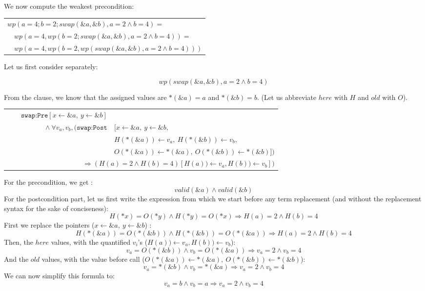 We now compute the weakest precondition:


\begin{tabular}{l}
  $wp(a = 4; b = 2; swap(\&a, \&b), a = 2 \wedge b = 4) = $\\
  $\quad wp(a = 4, wp(b = 2; swap(\&a, \&b), a = 2 \wedge b = 4)) = $\\
  $\quad wp(a = 4, wp(b = 2, wp(swap(\&a, \&b), a = 2 \wedge b = 4)))$
\end{tabular}


Let us first consider separately:


$$wp(swap(\&a, \&b), a = 2 \wedge b = 4)$$



From the  clause, we know that the assigned values are
$*(\&a) = a$ and $*(\&b) = b$. (Let us abbreviate $here$ with $H$ and $old$ with
$O$).


\begin{tabular}{rl}
  $\quad \quad \texttt{swap:Pre}[x \leftarrow \&a,\ y \leftarrow \&b]$ & \\
  $\quad \wedge \forall v_a, v_b,(\texttt{swap:Post}$ & $ [ x \leftarrow \&a,\ y \leftarrow \&b, $ \\
                               & $H(*(\&a)) \leftarrow v_a,\ H(*(\&b)) \leftarrow v_b,$ \\
                               & $O(*(\&a)) \leftarrow *(\&a),\ O(*(\&b)) \leftarrow *(\&b)])$\\
  \multicolumn{2}{r}{$\quad \quad \Rightarrow (H(a) = 2 \wedge H(b) = 4)[H(a)) \leftarrow v_a, H(b)) \leftarrow v_b])$}
\end{tabular}


For the precondition, we get :
$$valid(\&a) \wedge valid(\&b)$$
For the postcondition part, let us first write the expression from which
we start before any term replacement (and without the replacement syntax
for the sake of conciseness):
$$H(*x) = O(*y) \wedge H(*y) = O(*x) \Rightarrow H(a) = 2 \wedge H(b) = 4$$
First we replace the pointers ($x \leftarrow \&a,\ y \leftarrow \&b$) :
$$H(*(\&a)) = O(*(\&b)) \wedge H(*(\&b)) = O(*(\&a)) \Rightarrow H(a) = 2 \wedge H(b) = 4$$
Then, the $here$ values, with the quantified $v_i$'s ($H(a)) \leftarrow v_a, H(b)) \leftarrow v_b$):
$$v_a = O(*(\&b)) \wedge v_b = O(*(\&a)) \Rightarrow v_a = 2 \wedge v_b = 4$$
And the $old$ values, with the value before call
($O(*(\&a)) \leftarrow *(\&a),\ O(*(\&b)) \leftarrow *(\&b)$):
$$v_a = *(\&b) \wedge v_b = *(\&a) \Rightarrow v_a = 2 \wedge v_b = 4$$
We can now simplify this formula to:
$$v_a = b \wedge v_b = a \Rightarrow v_a = 2 \wedge v_b = 4$$


